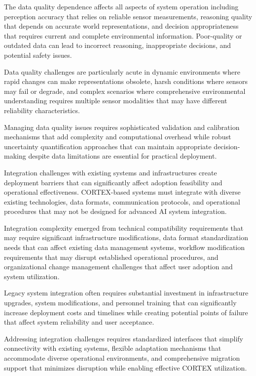 The data quality dependence affects all aspects of system operation including perception accuracy that relies on reliable sensor measurements, reasoning quality that depends on accurate world representations, and decision appropriateness that requires current and complete environmental information. Poor-quality or outdated data can lead to incorrect reasoning, inappropriate decisions, and potential safety issues.

Data quality challenges are particularly acute in dynamic environments where rapid changes can make representations obsolete, harsh conditions where sensors may fail or degrade, and complex scenarios where comprehensive environmental understanding requires multiple sensor modalities that may have different reliability characteristics.

Managing data quality issues requires sophisticated validation and calibration mechanisms that add complexity and computational overhead while robust uncertainty quantification approaches that can maintain appropriate decision-making despite data limitations are essential for practical deployment.

Integration challenges with existing systems and infrastructures create deployment barriers that can significantly affect adoption feasibility and operational effectiveness. CORTEX-based systems must integrate with diverse existing technologies, data formats, communication protocols, and operational procedures that may not be designed for advanced AI system integration.

Integration complexity emerged from technical compatibility requirements that may require significant infrastructure modifications, data format standardization needs that can affect existing data management systems, workflow modification requirements that may disrupt established operational procedures, and organizational change management challenges that affect user adoption and system utilization.

Legacy system integration often requires substantial investment in infrastructure upgrades, system modifications, and personnel training that can significantly increase deployment costs and timelines while creating potential points of failure that affect system reliability and user acceptance.

Addressing integration challenges requires standardized interfaces that simplify connectivity with existing systems, flexible adaptation mechanisms that accommodate diverse operational environments, and comprehensive migration support that minimizes disruption while enabling effective CORTEX utilization.

